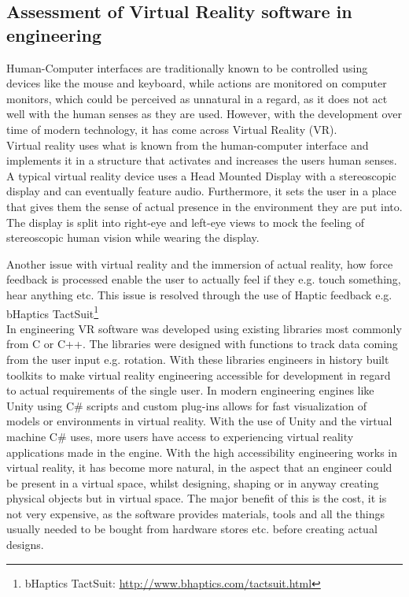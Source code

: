		\subsection{Assessment of Virtual Reality software in engineering}
		Human-Computer interfaces are traditionally known to be controlled using devices like the mouse and keyboard, while actions are monitored on computer monitors, which could be perceived as unnatural in a regard, as it does not act well with the human senses as they are used. However, with the development over time of modern technology, it has come across Virtual Reality (VR). \\
		
		Virtual reality uses what is known from the human-computer interface and implements it in a structure that activates and increases the users human senses. A typical virtual reality device uses a Head Mounted Display with a stereoscopic display and can eventually feature audio. Furthermore, it sets the user in a place that gives them the sense of actual presence in the environment they are put into. The display is split into right-eye and left-eye views to mock the feeling of stereoscopic human vision while wearing the display. 
		
		Another issue with virtual reality and the immersion of actual reality, how force feedback is processed enable the user to actually feel if they e.g. touch something, hear anything etc. This issue is resolved through the use of Haptic feedback e.g. bHaptics TactSuit\footnote{bHaptics TactSuit: \url{http://www.bhaptics.com/tactsuit.html}} \\
		
		In engineering VR software was developed using existing libraries most commonly from C or C++. The libraries were designed with functions to track data coming from the user input e.g. rotation. With these libraries engineers in history built toolkits to make virtual reality engineering accessible for development in regard to actual requirements of the single user. \cite{engineeringVR}
		In modern engineering engines like Unity using C\# scripts and custom plug-ins allows for fast visualization of models or environments in virtual reality. With the use of Unity and the virtual machine C\# uses, more users have access to experiencing virtual reality applications made in the engine. With the high accessibility engineering works in virtual reality, it has become more natural, in the aspect that an engineer could be present in a virtual space, whilst designing, shaping or in anyway creating physical objects but in virtual space. The major benefit of this is the cost, it is not very expensive, as the software provides materials, tools and all the things usually needed to be bought from hardware stores etc. before creating actual designs. \\ 
		
